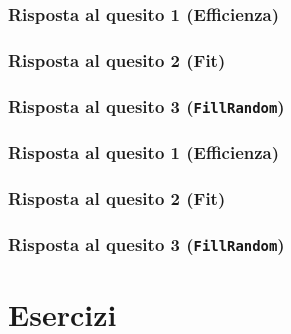 \documentclass{article}
\begin{document}
\subsubsection{Risposta al quesito 1 (Efficienza)}

\subsubsection{Risposta al quesito 2 (Fit)}

\subsubsection{Risposta al quesito 3 (\texttt{FillRandom})}


\subsubsection{Risposta al quesito 1 (Efficienza)}

\subsubsection{Risposta al quesito 2 (Fit)}

\subsubsection{Risposta al quesito 3 (\texttt{FillRandom})}


\section{Esercizi}








\end{document}

